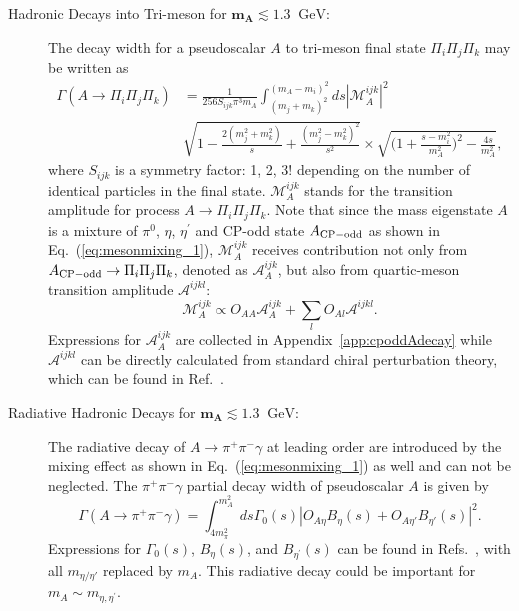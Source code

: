 \documentclass[letterpaper,11pt]{article}
\newcommand{\gev}{\text{~GeV}}
\def\gev{\textrm{~GeV}}
\begin{document}
\begin{description}
\item[Hadronic Decays into Tri-meson for $\mathbf{m_A \lesssim 1.3}~\gev$:] 
The decay width for a pseudoscalar $A$ to tri-meson final state $\Pi_i\Pi_j\Pi_k$   may be written as
\begin{equation}
\begin{aligned}
    \Gamma(A\to \Pi_i\Pi_j\Pi_k)&=\frac{1}{256S_{ijk}\pi^3m_A}\int_{(m_j+m_k)^2}^{(m_A-m_i)^2}ds  |\mathcal{M}_A^{ijk}|^2\\ &\sqrt{1-\frac{2(m_j^2+m_k^2)}{s}+\frac{(m_j^2-m_k^2)^2}{s^2}}\times\sqrt{\biggl(1+\frac{s-m_i^2}{m_A^2}\biggr)^2-\frac{4s}{m_A^2}},
\end{aligned}
\label{eq:trimeson}
\end{equation}
where  $S_{ijk}$ is a symmetry factor: 1, 2, $3!$ depending on the number of identical particles in the final state. $\mathcal{M}_A^{ijk}$ stands for the transition amplitude for process $A\to \Pi_i\Pi_j\Pi_k$.  Note that since the mass eigenstate $A$ is a mixture of $\pi^0$, $\eta$, $\eta^\prime$ and CP-odd state $A_{\rm CP-odd}$ as shown in Eq.~(\ref{eq:mesonmixing_1}), $\mathcal{M}_A^{ijk}$ receives contribution not only from $A_{\rm CP-odd}\to \Pi_i\Pi_j\Pi_k$,  denoted as $\mathcal{A}_A^{ijk}$, 
but also from quartic-meson transition amplitude  $\mathcal{A}^{ijkl}$:
 \begin{equation}
\mathcal{M}_A^{ijk}\propto  O_{AA}\mathcal{A}_A^{ijk} + \sum_l O_{Al}\mathcal{A}^{ijkl}.
\end{equation}
Expressions for $\mathcal{A}_A^{ijk}$ are collected in Appendix~\ref{app:cpoddAdecay} while $\mathcal{A}^{ijkl}$ can be directly calculated from standard chiral perturbation theory, which can be found in Ref.~\cite{Domingo:2016yih}.


\item[Radiative Hadronic Decays for $\mathbf{m_A \lesssim 1.3}~\gev$:]
The radiative decay of $A\to \pi^+\pi^-\gamma$ at leading order are introduced by the mixing effect as shown in Eq.~(\ref{eq:mesonmixing_1}) as well and  can not  be neglected.   The  $\pi^+\pi^-\gamma$ partial decay width of pseudoscalar $A$ is given by 
\begin{equation}
    \Gamma(A\to \pi^+\pi^-\gamma)=\int_{4m_\pi^2}^{m_A^2}ds \Gamma_0(s) |O_{A\eta}B_\eta(s)+O_{A\eta'}B_{\eta'}(s)|^2.
\end{equation}
Expressions for $\Gamma_0(s)$, $B_\eta(s)$, and $B_{\eta^\prime}(s)$ can be found in Refs.~\cite{Holstein:2001bt, M.A.B.:1972, Venugopal:1998fq}, with all $m_{\eta/\eta'}$ replaced by $m_A$.   This radiative decay could be important for  $m_A\sim m_{\eta, \eta^\prime}$.   
 

\end{description}
\end{document}
